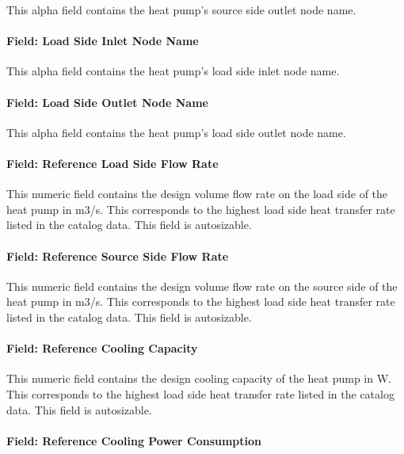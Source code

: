 This alpha field contains the heat pump's source side outlet node name.

\paragraph{Field: Load Side Inlet Node Name}\label{field-load-side-inlet-node-name}

This alpha field contains the heat pump's load side inlet node name.

\paragraph{Field: Load Side Outlet Node Name}\label{field-load-side-outlet-node-name}

This alpha field contains the heat pump's load side outlet node name.

\paragraph{Field: Reference Load Side Flow Rate}\label{field-rated-load-side-flow-rate}

This numeric field contains the design volume flow rate on the load side of the heat pump in m3/s. This corresponds to the highest load side heat transfer rate listed in the catalog data. This field is autosizable.

\paragraph{Field: Reference Source Side Flow Rate}\label{field-rated-source-side-flow-rate}

This numeric field contains the design volume flow rate on the source side of the heat pump in m3/s. This corresponds to the highest load side heat transfer rate listed in the catalog data. This field is autosizable.

\paragraph{Field: Reference Cooling Capacity}\label{field-rated-cooling-capacity}

This numeric field contains the design cooling capacity of the heat pump in W. This corresponds to the highest load side heat transfer rate listed in the catalog data. This field is autosizable.

\paragraph{Field: Reference Cooling Power Consumption}\label{field-rated-cooling-power-consumption}

